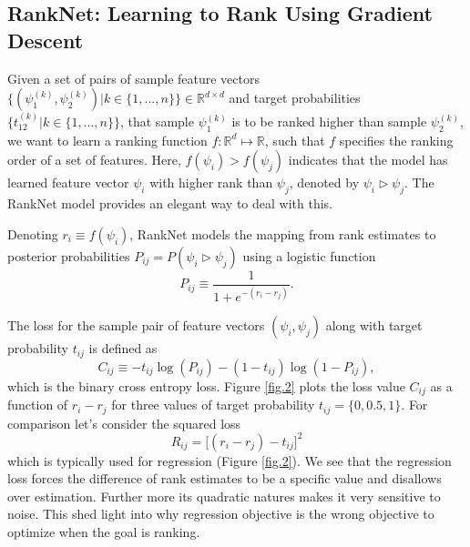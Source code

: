 \subsection{RankNet: Learning to Rank Using Gradient Descent}\label{sec3.1}
Given a set of pairs of sample feature vectors $\big\{( \psi_{1}^{(k)}, \psi_{2}^{(k)} ) | k \in \{1, ...,n\} \big\} \in \mathbb{R}^{d \times d}$ and target probabilities $\big\{ t_{12}^{(k)} | k \in \{1, ...,n\} \big\}$, that sample $\psi_{1}^{(k)}$ is to be ranked higher than sample $\psi_{2}^{(k)}$, we want to learn a ranking function $f : \mathbb{R}^d \mapsto \mathbb{R}$, such that %
$f$ specifies the ranking order of a set of features. Here, $f(\psi_i) > f(\psi_j)$ indicates that the model has learned feature vector $\psi_i$ with higher rank than $\psi_j$, denoted by $\psi_i \triangleright \psi_j$. The RankNet model \cite{Burges2005} provides an elegant way to deal with this.

Denoting $r_i \equiv f(\psi_i)$, RankNet models the mapping from rank estimates to posterior probabilities $P_{ij} = P(\psi_i \triangleright \psi_j)$ using a logistic function 
$$
P_{ij} \equiv \frac{1}{1 + e^{-(r_i - r_j)}}.
$$

The loss for the sample pair of feature vectors $(\psi_i, \psi_j)$ along with target probability $t_{ij}$ is defined as
$$
C_{ij} \equiv - t_{ij} \log (P_{ij}) - (1 - t_{ij}) \log (1 - P_{ij}),
$$
which is the binary cross entropy loss.
Figure \ref{fig.2} plots the loss value $C_{ij}$ as a function of $r_i - r_j$ for three values of target probability $t_{ij} = \{0, 0.5, 1\}$. For comparison let's consider the squared loss
$$
R_{ij} = \big[(r_i - r_j) - t_{ij}\big]^2
$$
which is typically used for regression (Figure \ref{fig.2}). We see that the regression loss forces the difference of rank estimates to be a specific value and disallows over estimation. Further more its quadratic natures makes it very sensitive to noise. This shed light into why regression objective is the wrong objective to optimize when the goal is ranking.


